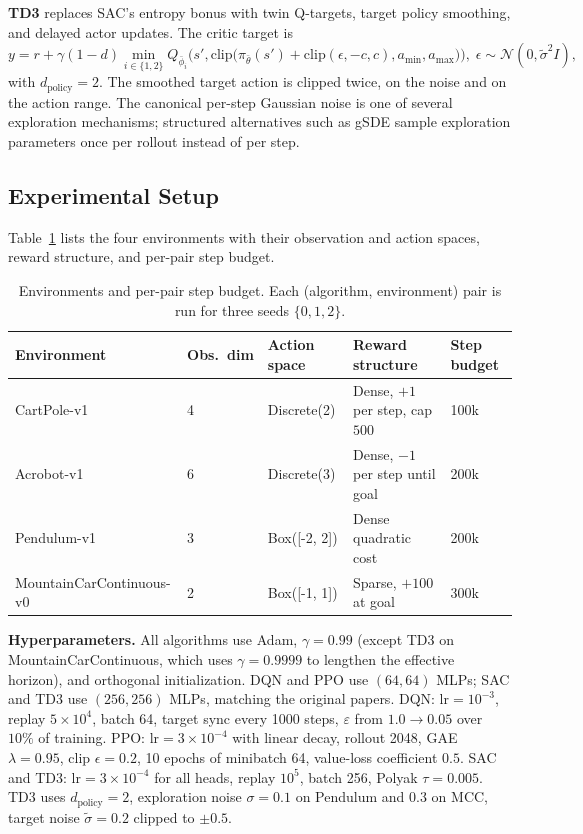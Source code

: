 \documentclass{article}
\begin{document}
\textbf{TD3} \cite{fujimoto2018addressing} replaces SAC's entropy bonus with twin Q-targets, target policy smoothing, and delayed actor updates. The critic target is
\begin{equation}
y = r + \gamma(1 - d) \min_{i \in \{1, 2\}} Q_{\bar{\phi}_i}\!\Big(s', \mathrm{clip}\!\big(\pi_{\bar{\theta}}(s') + \mathrm{clip}(\epsilon, -c, c), a_{\min}, a_{\max}\big)\Big),\; \epsilon \sim \mathcal{N}(0, \tilde{\sigma}^{2} I),
\label{eq:td3}
\end{equation}
with $d_{\text{policy}} = 2$. The smoothed target action is clipped twice, on the noise and on the action range. The canonical per-step Gaussian noise is one of several exploration mechanisms; structured alternatives such as gSDE \cite{raffin2022smooth} sample exploration parameters once per rollout instead of per step.

\subsection{Experimental Setup}
\label{sec:setup}

Table~\ref{tab:envs} lists the four environments with their observation and action spaces, reward structure, and per-pair step budget.

\begin{table}[ht]
\centering
\small
\caption{Environments and per-pair step budget. Each (algorithm, environment) pair is run for three seeds $\{0, 1, 2\}$.}
\label{tab:envs}
\begin{tabular}{lllll}
\toprule
Environment & Obs.\ dim & Action space & Reward structure & Step budget \\
\midrule
CartPole-v1               & 4 & Discrete(2)         & Dense, $+1$ per step, cap $500$  & 100k \\
Acrobot-v1                & 6 & Discrete(3)         & Dense, $-1$ per step until goal & 200k \\
Pendulum-v1               & 3 & Box([-2, 2])        & Dense quadratic cost            & 200k \\
MountainCarContinuous-v0  & 2 & Box([-1, 1])        & Sparse, $+100$ at goal           & 300k \\
\bottomrule
\end{tabular}
\end{table}

\textbf{Hyperparameters.} All algorithms use Adam, $\gamma = 0.99$ (except TD3 on MountainCarContinuous, which uses $\gamma = 0.9999$ to lengthen the effective horizon), and orthogonal initialization. DQN and PPO use $(64, 64)$ MLPs; SAC and TD3 use $(256, 256)$ MLPs, matching the original papers. DQN: $\mathrm{lr} = 10^{-3}$, replay $5 \times 10^{4}$, batch 64, target sync every 1000 steps, $\varepsilon$ from $1.0 \to 0.05$ over $10\%$ of training. PPO: $\mathrm{lr} = 3 \times 10^{-4}$ with linear decay, rollout 2048, GAE $\lambda = 0.95$, clip $\epsilon = 0.2$, 10 epochs of minibatch 64, value-loss coefficient $0.5$. SAC and TD3: $\mathrm{lr} = 3 \times 10^{-4}$ for all heads, replay $10^{5}$, batch 256, Polyak $\tau = 0.005$. TD3 uses $d_{\text{policy}} = 2$, exploration noise $\sigma = 0.1$ on Pendulum and $0.3$ on MCC, target noise $\tilde{\sigma} = 0.2$ clipped to $\pm 0.5$.
\end{document}
